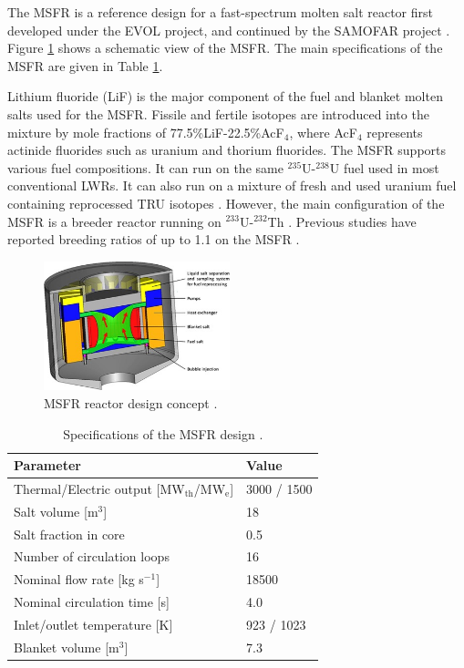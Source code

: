 \documentclass{anstrans}
\begin{document}
	The \gls{MSFR} is a reference design for a fast-spectrum molten salt
	reactor
	first developed under the \gls{EVOL} project, and continued by the
	\gls{SAMOFAR} project \cite{serp_molten_2014}.
	Figure \ref{fig:msfr} shows a schematic view of the \gls{MSFR}. The main
	specifications of the \gls{MSFR} are given in Table \ref{table:msfr}.

	Lithium fluoride (LiF) is the major component of the fuel and blanket
	molten salts used for the \gls{MSFR}. Fissile and fertile isotopes are
	introduced
	into the mixture by mole fractions of 77.5\%LiF-22.5\%AcF$_4$, where
	AcF$_4$ represents actinide fluorides such as uranium and thorium
	fluorides.
	The \gls{MSFR} supports various fuel compositions. It can run on the same 
	$^{235}$U-$^{238}$U fuel used in most conventional LWRs. It can also run
	on a
	mixture of fresh and used uranium fuel containing reprocessed TRU
	isotopes \cite{fiorina_investigation_2013}. However, the main configuration
	of the \gls{MSFR} is a breeder reactor running on $^{233}$U-$^{232}$Th
	\cite{merle-lucotte_launching_2011}. Previous studies have reported
	breeding ratios of up to 1.1 on the \gls{MSFR} \cite{fiorina_molten_2013}. 

\begin{figure}[t] 
	\centering
	\includegraphics[width=0.48\textwidth]{./figures/MSFR}
	\caption{MSFR reactor design concept \cite{serp_molten_2014}.}
	\label{fig:msfr}
\end{figure} 

\begin{table}[t]
	\caption{Specifications of the \gls{MSFR} design \cite{serp_molten_2014}.}
	\begin{tabular}{ l l }
		\hline
		Parameter & Value \\
		\hline
		Thermal/Electric output [MW$_{\text{th}}$/MW$_{\text{e}}$] & 3000 /
		1500 
		\\
		Salt volume [m$^3$] & 18 \\
		Salt fraction in core & 0.5 \\
		Number of circulation loops & 16 \\
		Nominal flow rate [kg s$^{-1}$] & 18500  \\
		Nominal circulation time [s] & 4.0 \\
		Inlet/outlet temperature [K] & 923 / 1023 \\
		Blanket volume [m$^3$] & 7.3\\
		\hline
	\end{tabular}
	\label{table:msfr}
\end{table}
\end{document}
